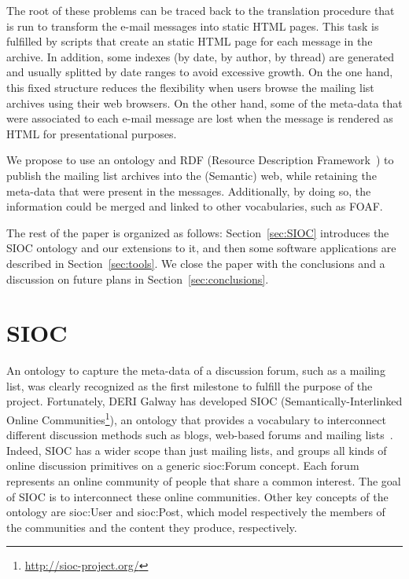\documentclass{llncs}
\begin{document}
The root of these problems can be traced back to the translation
procedure that is run to transform the e-mail messages into static
HTML pages. This task is fulfilled by scripts that create an
static HTML page for each message in the archive. In addition,
some indexes (by date, by author, by thread) are generated and
usually splitted by date ranges to avoid excessive growth.
On the one hand, this 
fixed structure reduces the flexibility when users browse the
mailing list archives using their web browsers. On the other hand, some 
of the meta-data that were associated to each e-mail message are lost
when the message is rendered as HTML for presentational purposes.

We propose to use an ontology and RDF (Resource Description
Framework~\cite{RDF}) to publish the mailing list archives into 
the (Semantic) web, while retaining the meta-data that were present in 
the messages. Additionally, by doing so, the information could be
merged and linked to other vocabularies, such as FOAF.

The rest of the paper is organized as follows: 
Section~\ref{sec:SIOC} introduces the SIOC ontology and our extensions 
to it, and then some software applications are described in 
Section~\ref{sec:tools}. We close the paper with the conclusions and 
a discussion on future plans in Section~\ref{sec:conclusions}.

\section{\label{sec:SIOC}SIOC}

An ontology to capture the meta-data of a discussion forum, such as
a mailing list, was clearly recognized as the first milestone to
fulfill the purpose of the project. Fortunately, DERI Galway has 
developed SIOC (Semantically-Interlinked Online
Communities\footnote{\url{http://sioc-project.org/}}), an ontology that provides a vocabulary to interconnect 
different discussion methods such as blogs, web-based forums and mailing 
lists~\cite{Breslin2006,Breslin2005}. Indeed, SIOC has a wider 
scope than just mailing lists, and groups all kinds of online discussion 
primitives on a generic \textsf{sioc:Forum} concept. Each forum represents 
an online community of people that share a common interest. The goal 
of SIOC is to interconnect these online communities. Other key concepts 
of the ontology are \textsf{sioc:User} and \textsf{sioc:Post}, which 
model respectively the members of the communities and the content they 
produce, respectively.
\end{document}
